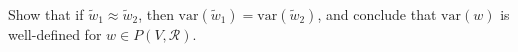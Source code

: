 Show that if $\tilde{w}_1 \approx \tilde{w}_2$, then $\text{var}(\tilde{w}_1) = \text{var}(\tilde{w}_2)$, and conclude that $\text{var}(w)$ is well-defined for $w \in P(V, \mathcal{R})$.

